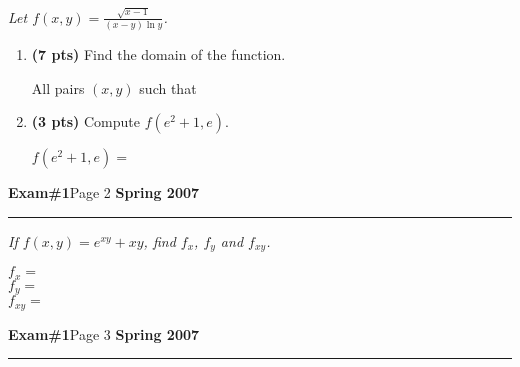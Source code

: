 \documentclass[12pt]{article}
\begin{document}
\bigskip
{\problem \em Let $f(x,y) = \displaystyle{\frac{\sqrt{x-1}}{(x-y) \ln
      y}}$.}
\begin{enumerate}
\item {\bf (7 pts)} Find the domain of the function.
\vspace{7cm}
  \begin{flushright}
     All pairs $(x,y)$ such that
     \framebox[6cm]{\raisebox{1cm}[0.6cm][0.4cm]}
  \end{flushright}
\item {\bf (3 pts)} Compute $f(e^2+1,e)$.
\vspace{7cm}
  \begin{flushright}
     $f(e^2+1,e) =$ \framebox[6cm]{\raisebox{1cm}[0.6cm][0.4cm]}
  \end{flushright}
\end{enumerate}
\newpage
\hfill{\large\bf Exam\#1}\hfill Page 2\hfill{\large\bf
  Spring 2007}\hrule

\bigskip
{\problem[12 pts] \em If $f(x,y) = e^{xy} + xy$, find $f_x$, $f_y$ and
  $f_{xy}$.}
\vspace{17cm}
\begin{flushright}
  $f_x =$ \framebox[6cm]{\raisebox{1cm}[0.6cm][0.4cm]} \\
  $f_y =$ \framebox[6cm]{\raisebox{1cm}[0.6cm][0.4cm]} \\
  $f_{xy} =$ \framebox[6cm]{\raisebox{1cm}[0.6cm][0.4cm]}
\end{flushright}
\newpage

\hfill{\large\bf Exam\#1}\hfill Page 3\hfill{\large\bf
  Spring 2007}\hrule
\end{document}
